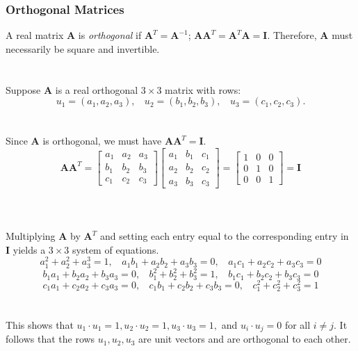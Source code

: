 \documentclass[../setup.tex]{subfiles}
\newcommand{\tab}{\ \ \ \ }
\begin{document}
\subsubsection{Orthogonal Matrices}
A real matrix $\bm{A}$ is \textit{orthogonal} if $\bm{A}^T = \bm{A}^{-1}$; $\bm{A}\bm{A}^T = \bm{A}^T\bm{A} = \bm{I}$. Therefore, $\bm{A}$ must necessarily be square and invertible. \\
\phantom \\ \\
Suppose $\bm{A}$ is a real orthogonal $3 \times 3$ matrix with rows:
\[u_1 = (a_1, a_2, a_3), \ \ \ \ u_2 = (b_1, b_2, b_3), \ \ \ \ u_3 = (c_1, c_2, c_3).\]
\phantom \\ \\
Since $\bm{A}$ is orthogonal, we must have $\bm{A}\bm{A}^T = \bm{I}$. \\
\[\bm{A}\bm{A}^T = \begin{bmatrix}a_1 & a_2 & a_3 \\ b_1 & b_2 & b_3 \\ c_1 & c_2 & c_3\end{bmatrix}\begin{bmatrix}a_1 & b_1 & c_1 \\ a_2 & b_2 & c_2 \\ a_3 & b_3 & c_3\end{bmatrix}
= \begin{bmatrix}1 & 0 & 0 \\ 0 & 1 & 0 \\ 0 & 0 & 1\end{bmatrix} = \bm{I}\] \\
\phantom \\ \\
Multiplying $\bm{A}$ by $\bm{A}^T$ and setting each entry equal to the corresponding entry in $\bm{I}$ yields a $3 \times 3$ system of equations.
\[a_1^2 + a_2^2 + a_3^3 = 1, \tab a_1b_1 + a_2b_2 + a_3b_3 = 0, \tab a_1c_1 + a_2c_2 + a_3c_3 = 0\]
\[b_1a_1 + b_2a_2 + b_3a_3 = 0, \tab b_1^2 + b_2^2 + b_3^2 = 1, \tab b_1c_1 + b_2c_2 + b_3c_3 = 0\]
\[c_1a_1 + c_2a_2 + c_3a_3 = 0, \tab c_1b_1 + c_2b_2 + c_3b_3 = 0, \tab c_1^2 + c_2^2 + c_3^2 = 1\]
\phantom \\ \\
This shows that $u_1 \cdot u_1 = 1, u_2 \cdot u_2 = 1, u_3 \cdot u_3 = 1,$ and $u_i \cdot u_j = 0$ for all $i \neq j$. It follows that the rows $u_1, u_2, u_3$ are unit vectors and are orthogonal to each other. \\
\phantom \\ \\
\end{document}
